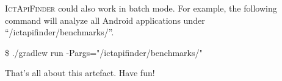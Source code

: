 \documentclass[11pt]{article}
\begin{document}
\textsc{IctApiFinder} could also work in batch mode. For example, the following command will analyze all Android applications under ``/ictapifinder/benchmarks/''.
\begin{framed}
	\noindent\$ ./gradlew run -Pargs="/ictapifinder/benchmarks/"
\end{framed}

That's all about this artefact. Have fun!
\end{document}
